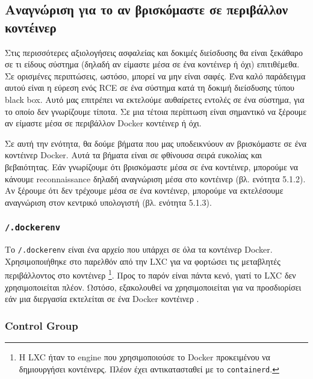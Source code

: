 \subsection{Αναγνώριση για το αν βρισκόμαστε σε περιβάλλον κοντέινερ}

Στις περισσότερες αξιολογήσεις ασφαλείας και δοκιμές διείσδυσης θα είναι
ξεκάθαρο σε τι είδους σύστημα (δηλαδή αν είμαστε μέσα σε ένα κοντέινερ ή όχι)
επιτιθέμεθα. Σε ορισμένες περιπτώσεις, ωστόσο, μπορεί να μην είναι σαφές. Ένα
καλό παράδειγμα αυτού είναι η εύρεση ενός \textlatin{RCE} σε ένα σύστημα κατά τη
δοκιμή διείσδυσης τύπου \textlatin{black box}. Αυτό μας επιτρέπει να εκτελούμε
αυθαίρετες εντολές σε ένα σύστημα, για το οποίο δεν γνωρίζουμε τίποτα. Σε μια
τέτοια περίπτωση είναι σημαντικό να ξέρουμε αν είμαστε μέσα σε περιβάλλον
\textlatin{Docker} κοντέινερ ή όχι.

Σε αυτή την ενότητα, θα δούμε βήματα που μας υποδεικνύουν αν βρισκόμαστε σε ένα
κοντέινερ \textlatin{Docker}. Αυτά τα βήματα είναι σε φθίνουσα σειρά ευκολίας
και βεβαιότητας. Εάν γνωρίζουμε ότι βρισκόμαστε μέσα σε ένα κοντέινερ, μπορούμε
να κάνουμε \textlatin{reconnaissance} δηλαδή αναγνώριση μέσα στο κοντέινερ (βλ.
ενότητα 5.1.2). Αν ξέρουμε ότι δεν τρέχουμε μέσα σε ένα κοντέινερ, μπορούμε να
εκτελέσουμε αναγνώριση στον κεντρικό υπολογιστή (βλ. ενότητα 5.1.3).

\subsubsection{\texttt{\textlatin{/.dockerenv}}}

Το \texttt{\textlatin{/.dockerenv}} είναι ένα αρχείο που υπάρχει σε όλα τα
κοντέινερ \textlatin{Docker}. Χρησιμοποιήθηκε στο παρελθόν από την
\textlatin{LXC} για να φορτώσει τις μεταβλητές περιβάλλοντος στο κοντέινερ
\footnote{Η \textlatin{LXC} ήταν το \textlatin{engine} που χρησιμοποιούσε το
\textlatin{Docker} προκειμένου να δημιουργήσει κοντέινερς. Πλέον έχει
αντικατασταθεί με το \texttt{\textlatin{containerd}}.}.
Προς το παρόν είναι πάντα κενό, γιατί το \textlatin{LXC} δεν χρησιμοποιείται
πλέον. Ωστόσο, εξακολουθεί να χρησιμοποιείται για να προσδιορίσει εάν
μια διεργασία εκτελείται σε ένα \textlatin{Docker} κοντέινερ
\cite{Metasploit-Linux-Gather-Container-Detection}
\cite{Removed-Dockerinit-Reference}.


\subsubsection{\textlatin{Control Group}}

